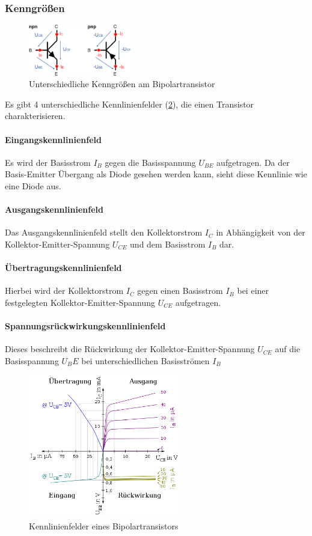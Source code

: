 	\subsubsection{Kenngrößen}
	\begin{figure}[h]
		\centering
		\includegraphics[width=0.4\textwidth]{Kapitel/Kap10/groessen.png}
		\caption{Unterschiedliche Kenngrößen am Bipolartransistor}
		\label{10_groessen}
	\end{figure}
	Es gibt 4 unterschiedliche Kennlinienfelder (\ref{10_kennlinie}), die einen Transistor charakterisieren.
	\paragraph{Eingangskennlinienfeld} Es wird der Basisstrom $I_B$ gegen die Basisspannung $U_{BE}$ aufgetragen. Da der Basis-Emitter Übergang als Diode gesehen werden kann, sieht diese Kennlinie wie eine Diode aus.
	\paragraph{Ausgangskennlinienfeld} Das Ausgangskennlinienfeld stellt den Kollektorstrom $I_C$ in Abhängigkeit von der Kollektor-Emitter-Spannung $U_{CE}$ und dem Basisstrom $I_B$ dar.
	\paragraph{Übertragungskennlinienfeld} Hierbei wird der Kollektorstrom $I_C$ gegen einen Basisstrom $I_B$ bei einer festgelegten Kollektor-Emitter-Spannung $U_{CE}$ aufgetragen.
	\paragraph{Spannungsrückwirkungskennlinienfeld} Dieses beschreibt die Rückwirkung der Kollektor-Emitter-Spannung $U_{CE}$ auf die Basisspannung $U_BE$ bei unterschiedlichen Basisströmen $I_B$
	\begin{figure}[h]
		\centering
		\includegraphics[width=0.6\textwidth]{Kapitel/Kap10/kennlinien.png}
		\caption{Kennlinienfelder eines Bipolartransistors}
		\label{10_kennlinie}
	\end{figure}
	  
